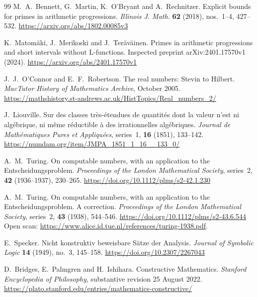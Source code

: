 \documentclass[11pt,reqno]{amsart}
\theoremstyle{blueplain}
\numberwithin{equation}{section}
\def\hyperlink#1#2{#2}}
\begin{document}
\begin{thebibliography}{99}
	\hypertarget{abbr-source:BennettMartinOBryantRechnitzer2018}{}
	M.~A.~Bennett, G.~Martin, K.~O'Bryant and A.~Rechnitzer.
	Explicit bounds for primes in arithmetic progressions.
	\hyperlink{abbr:journal-Illinois-J-Math}{\emph{Illinois J. Math.}} \textbf{62} (2018),
	nos.~1--4, 427--532.
	\url{https://arxiv.org/abs/1802.00085v3}
	
	K.~Matom\"aki, J.~Merikoski and J.~Ter\"av\"ainen.
	Primes in arithmetic progressions and short intervals without L-functions.
	Inspected preprint arXiv:2401.17570v1 (2024).
	\url{https://arxiv.org/abs/2401.17570v1}
	

	J.~J.~O'Connor and E.~F.~Robertson.
	The real numbers: Stevin to Hilbert.
	\emph{MacTutor History of Mathematics Archive}, October 2005.
	\url{https://mathshistory.st-andrews.ac.uk/HistTopics/Real_numbers_2/}

	J.~Liouville.
	Sur des classes tr\`es-\'etendues de quantit\'es dont la valeur n'est ni
	alg\'ebrique, ni m\^eme r\'eductible \`a des irrationnelles alg\'ebriques.
	\emph{Journal de Math\'ematiques Pures et Appliqu\'ees},
	series~1, \textbf{16} (1851), 133--142.
	\url{https://numdam.org/item/JMPA_1851_1_16__133_0/}

	A.~M.~Turing.
	On computable numbers, with an application to the Entscheidungsproblem.
	\emph{Proceedings of the London Mathematical Society},
	series~2, \textbf{42} (1936--1937), 230--265.
	\url{https://doi.org/10.1112/plms/s2-42.1.230}

	A.~M.~Turing.
	On computable numbers, with an application to the Entscheidungsproblem.
	A correction.
	\emph{Proceedings of the London Mathematical Society},
	series~2, \textbf{43} (1938), 544--546.
	\url{https://doi.org/10.1112/plms/s2-43.6.544}
	Open scan: \url{https://www.alice.id.tue.nl/references/turing-1938.pdf}.

	E.~Specker.
	Nicht konstruktiv beweisbare S\"atze der Analysis.
	\emph{Journal of Symbolic Logic} \textbf{14} (1949), no.~3, 145--158.
	\url{https://doi.org/10.2307/2267043}

	D.~Bridges, E.~Palmgren and H.~Ishihara.
	Constructive Mathematics.
	\emph{Stanford Encyclopedia of Philosophy},
	substantive revision 25 August 2022.
	\url{https://plato.stanford.edu/entries/mathematics-constructive/}


\end{thebibliography}
\end{document}
